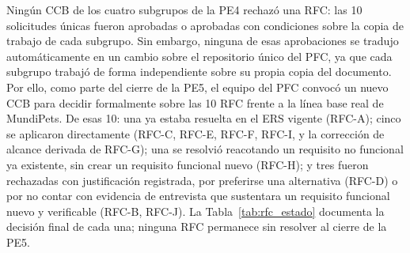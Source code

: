 \documentclass[journal,onecolumn]{IEEEtran}
\begin{document}
Ningún CCB de los cuatro subgrupos de la PE4 rechazó una RFC: las 10
solicitudes únicas fueron aprobadas o aprobadas con condiciones sobre la
copia de trabajo de cada subgrupo. Sin embargo, ninguna de esas
aprobaciones se tradujo automáticamente en un cambio sobre el
repositorio único del PFC, ya que cada subgrupo trabajó de forma
independiente sobre su propia copia del documento. Por ello, como parte
del cierre de la PE5, el equipo del PFC convocó un nuevo CCB para
decidir formalmente sobre las 10 RFC frente a la línea base real de
MundiPets. De esas 10: una ya estaba resuelta en el ERS vigente (RFC-A);
cinco se aplicaron directamente (RFC-C, RFC-E, RFC-F, RFC-I, y la
corrección de alcance derivada de RFC-G); una se resolvió reacotando un
requisito no funcional ya existente, sin crear un requisito funcional
nuevo (RFC-H); y tres fueron rechazadas con justificación registrada,
por preferirse una alternativa (RFC-D) o por no contar con evidencia de
entrevista que sustentara un requisito funcional nuevo y verificable
(RFC-B, RFC-J). La Tabla~\ref{tab:rfc_estado} documenta la decisión final
de cada una; ninguna RFC permanece sin resolver al cierre de la PE5.
\end{document}
